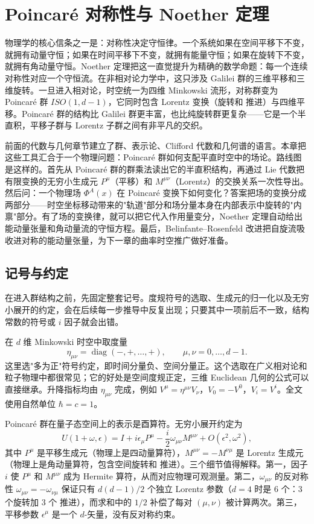 \chapter{Poincaré 对称性与 Noether 定理} \label{chap:math-spacetime}

物理学的核心信条之一是：对称性决定守恒律。一个系统如果在空间平移下不变，就拥有动量守恒；如果在时间平移下不变，就拥有能量守恒；如果在旋转下不变，就拥有角动量守恒。Noether 定理把这一直觉提升为精确的数学命题：每一个连续对称性对应一个守恒流。在非相对论力学中，这只涉及 Galilei 群的三维平移和三维旋转。一旦进入相对论，时空统一为四维 Minkowski 流形，对称群变为 Poincaré 群 $ISO(1,d-1)$，它同时包含 Lorentz 变换（旋转和 推进）与四维平移。Poincaré 群的结构比 Galilei 群更丰富，也比纯旋转群更复杂——它是一个半直积，平移子群与 Lorentz 子群之间有非平凡的交织。

前面的代数与几何章节建立了群、表示论、Clifford 代数和几何谱的语言。本章把这些工具汇合于一个物理问题：Poincaré 群如何支配平直时空中的场论。路线图是这样的。首先从 Poincaré 群的群乘法读出它的半直积结构，再通过 Lie 代数把有限变换的无穷小生成元 $P^\mu$（平移）和 $M^{\mu\nu}$（Lorentz）的交换关系一次性导出。然后问：一个物理场 $\Phi^A(x)$ 在 Poincaré 变换下如何变化？答案把场的变换分成两部分——时空坐标移动带来的"轨道"部分和场分量本身在内部表示中旋转的"内禀"部分。有了场的变换律，就可以把它代入作用量变分，Noether 定理自动给出能动量张量和角动量流的守恒方程。最后，Belinfante--Rosenfeld 改进把自旋流吸收进对称的能动量张量，为下一章的曲率时空推广做好准备。

\section{记号与约定}

在进入群结构之前，先固定整套记号。度规符号的选取、生成元的归一化以及无穷小展开的约定，会在后续每一步推导中反复出现；只要其中一项前后不一致，结构常数的符号或 $i$ 因子就会出错。

在 $d$ 维 Minkowski 时空中取度量
\begin{equation*}\eta_{\mu\nu}=\operatorname{diag}(-,+,\ldots,+),\qquad \mu,\nu=0,\ldots,d-1.
\end{equation*}
这里选"多为正"符号约定，即时间分量负、空间分量正。这个选取在广义相对论和粒子物理中都很常见；它的好处是空间度规正定，三维 Euclidean 几何的公式可以直接继承。升降指标均由 $\eta_{\mu\nu}$ 完成，例如 $V^\mu=\eta^{\mu\nu}V_\nu$，$V_0=-V^0$，$V_i=V^i$。全文使用自然单位 $\hbar=c=1$。

Poincaré 群在量子态空间上的表示是酉算符。无穷小展开约定为
\begin{equation}\label{eq:ms-poincare-U-expand}
\boxed{
U(1+\omega,\epsilon)=I+i\epsilon_\mu P^\mu-\frac{i}{2}\omega_{\mu\nu}M^{\mu\nu}+O(\epsilon^2,\omega^2),
}
\end{equation}
其中 $P^\mu$ 是平移生成元（物理上是四动量算符），$M^{\mu\nu}=-M^{\nu\mu}$ 是 Lorentz 生成元（物理上是角动量算符，包含空间旋转和 推进）。三个细节值得解释。第一，因子 $i$ 使 $P^\mu$ 和 $M^{\mu\nu}$ 成为 Hermite 算符，从而对应物理可观测量。第二，$\omega_{\mu\nu}$ 的反对称性 $\omega_{\mu\nu}=-\omega_{\nu\mu}$ 保证只有 $d(d-1)/2$ 个独立 Lorentz 参数（$d=4$ 时是 6 个：3 个旋转加 3 个 推进），而求和中的 $1/2$ 补偿了每对 $(\mu,\nu)$ 被计算两次。第三，平移参数 $\epsilon^\mu$ 是一个 $d$-矢量，没有反对称约束。

